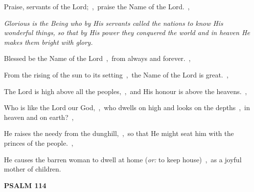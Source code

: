 \documentclass[12pt,twoside,a5paper]{article}
\newcommand{\psalm}[1]{\textbf{PSALM {#1}}\nopagebreak}
\newcommand{\qanona}[1]{{\liturgicalhint{Qanona.} \emph{#1}}}
\newcommand{\translationoption}[1]{\emph{or:} #1}
\begin{document}
\begin{normalparskip}
  Praise, servants of the Lord;~\sep\ praise the Name of the Lord.~\sep

  \qanona{Glorious is the Being who by His servants called the nations to know His wonderful things, so that by His power they conquered the world and in heaven He makes them bright with glory.}

  Blessed be the Name of the Lord~\sep\ from always and forever.~\sep

  From the rising of the sun to its setting~\sep\ the Name of the Lord is great.~\sep

  The Lord is high above all the peoples,~\sep\ and His honour is above the heavens.~\sep

  Who is like the Lord our God,~\sep\ who dwells on high and looks on the depths~\sep\ in heaven and on earth?~\sep

  He raises the needy from the dunghill,~\sep\ so that He might seat him with the princes of the people.~\sep

  He causes the barren woman to dwell at home (\translationoption{to keep house})~\sep\ as a joyful mother of children.
\end{normalparskip}

\psalm{114}
\end{document}
